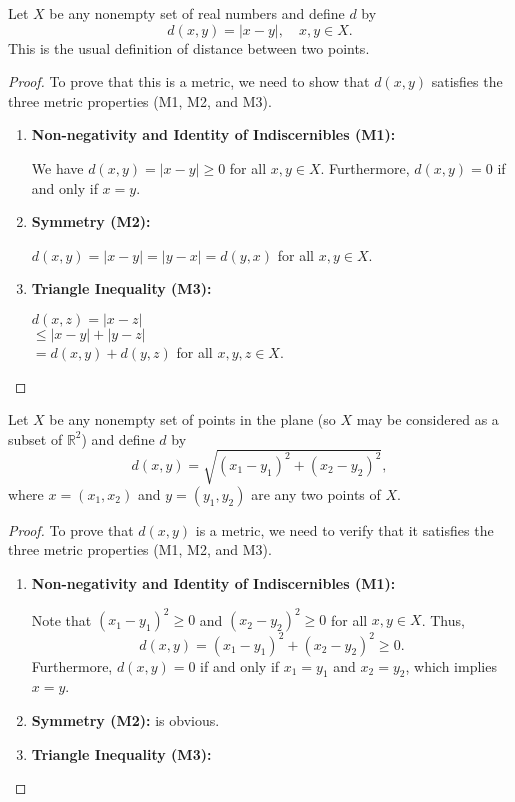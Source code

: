 \begin{example}
    Let \( X \) be any nonempty set of real numbers and define \( d \) by
    \[
    d(x, y) = |x - y|, \quad x, y \in X.
    \]
    This is the usual definition of distance between two points. 
\end{example}
\begin{proof}
To prove that this is a metric, we need to show that \( d(x, y) \) satisfies the three metric properties (M1, M2, and M3).

\begin{enumerate}
    \item \textbf{Non-negativity and Identity of Indiscernibles (M1):}
    
    We have \( d(x, y) = |x - y| \geq 0 \) for all \( x, y \in X \). Furthermore, \( d(x, y) = 0 \) if and only if \( x = y \).
    
    \item \textbf{Symmetry (M2):}
    
    \( d(x, y) = |x - y| = |y - x| = d(y, x) \) for all \( x, y \in X \).
    
    \item \textbf{Triangle Inequality (M3):}
    
    \( d(x, z) = |x - z| \) \\
    \( \leq |x - y| + |y - z| \) \\
    \( = d(x, y) + d(y, z) \) for all \( x, y, z \in X \).
\end{enumerate}
\end{proof}


\begin{example}[Distance in $\RR^2$]
    Let \( X \) be any nonempty set of points in the plane (so \( X \) may be considered as a subset of \( \mathbb{R}^2 \)) and define \( d \) by
    \[
    d(x, y) = \sqrt{(x_1 - y_1)^2 + (x_2 - y_2)^2},
    \]
    where \( x = (x_1, x_2) \) and \( y = (y_1, y_2) \) are any two points of \( X \).
\end{example}

\begin{proof}
To prove that \( d(x, y) \) is a metric, we need to verify that it satisfies the three metric properties (M1, M2, and M3).

\begin{enumerate}
    \item \textbf{Non-negativity and Identity of Indiscernibles (M1):}
    
    Note that \( (x_1 - y_1)^2 \geq 0 \) and \( (x_2 - y_2)^2 \geq 0 \) for all \( x, y \in X \). Thus,
    \[
    d(x, y) = (x_1 - y_1)^2 + (x_2 - y_2)^2 \geq 0.
    \]
    Furthermore, \( d(x, y) = 0 \) if and only if \( x_1 = y_1 \) and \( x_2 = y_2 \), which implies \( x = y \).
    
    \item \textbf{Symmetry (M2):} is obvious.  
    \item \textbf{Triangle Inequality (M3):}
\end{enumerate}
\end{proof}


